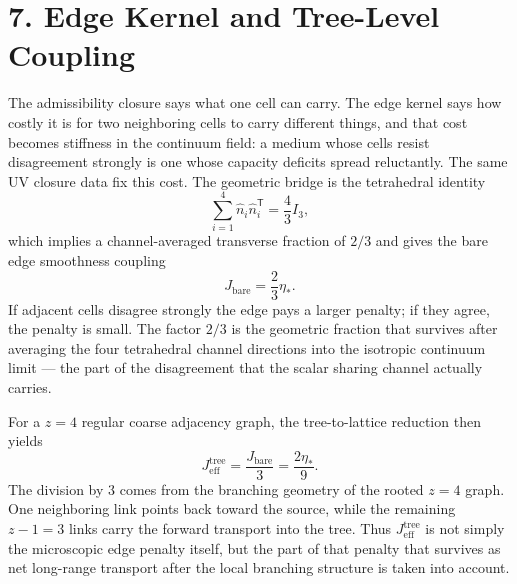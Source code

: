 \documentclass[11pt]{article}
\begin{document}
\section{7. Edge Kernel and Tree-Level Coupling}

The admissibility closure says what one cell can carry. The edge kernel says how costly it is for two neighboring cells to carry different things, and that cost becomes stiffness in the continuum field: a medium whose cells resist disagreement strongly is one whose capacity deficits spread reluctantly. The same UV closure data fix this cost. The geometric bridge is the tetrahedral identity
\[
\sum_{i=1}^4 \hat n_i\hat n_i^{\mathsf T}=\frac{4}{3}I_3,
\]
which implies a channel-averaged transverse fraction of $2/3$ and gives the bare edge smoothness coupling
\[
J_{\mathrm{bare}}=\frac{2}{3}\eta_*.
\]
If adjacent cells disagree strongly the edge pays a larger penalty; if they agree, the penalty is small. The factor $2/3$ is the geometric fraction that survives after averaging the four tetrahedral channel directions into the isotropic continuum limit --- the part of the disagreement that the scalar sharing channel actually carries.

For a $z=4$ regular coarse adjacency graph, the tree-to-lattice reduction then yields
\[
J_{\mathrm{eff}}^{\mathrm{tree}}=\frac{J_{\mathrm{bare}}}{3}=\frac{2\eta_*}{9}.
\]
The division by $3$ comes from the branching geometry of the rooted $z=4$ graph. One neighboring link points back toward the source, while the remaining $z-1=3$ links carry the forward transport into the tree. Thus $J_{\mathrm{eff}}^{\mathrm{tree}}$ is not simply the microscopic edge penalty itself, but the part of that penalty that survives as net long-range transport after the local branching structure is taken into account.
\end{document}
